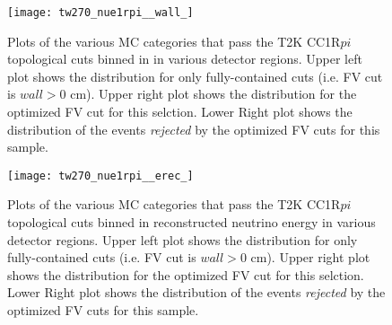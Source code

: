 \begin{figure}[h]
  \begin{center}
    \texttt{[image: tw270\_nue1rpi\_\_wall\_]}
  \end{center}
  \caption{Plots of the various MC categories that pass the T2K \nue CC1R$pi$
  topological cuts binned in \wall in various detector regions. Upper left plot
  shows the distribution for only fully-contained cuts (i.e. FV cut is \@ $wall
  > 0$ cm).  Upper right plot shows the distribution for the optimized FV cut
  for this selction.  Lower Right plot shows the distribution of the events
  \emph{rejected} by the optimized FV cuts for this sample.
  }
  \label{fig:compnue1rpiwall}
\end{figure}


\begin{figure}[h]
  \begin{center}
    \texttt{[image: tw270\_nue1rpi\_\_erec\_]}
  \end{center}
  \caption{Plots of the various MC categories that pass the T2K \nue CC1R$pi$
  topological cuts binned in reconstructed neutrino energy in various detector
  regions. Upper left plot shows the distribution for only fully-contained cuts
  (i.e. FV cut is \@ $wall > 0$ cm).  Upper right plot shows the distribution
  for the optimized FV cut for this selction.  Lower Right plot shows the
  distribution of the events \emph{rejected} by the optimized FV cuts for this
  sample.
  }
  \label{fig:compnue1rpierec}
\end{figure}

